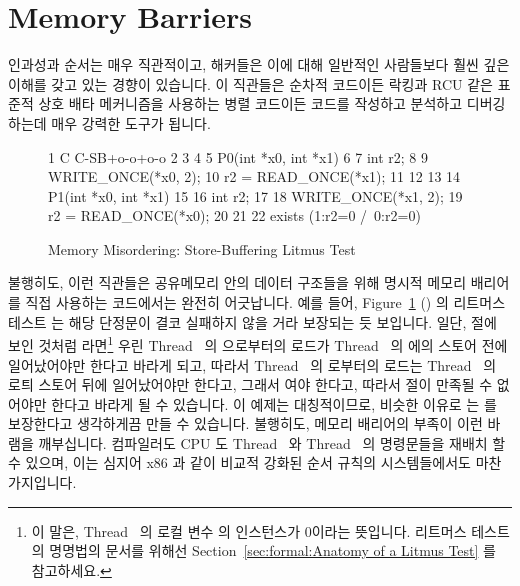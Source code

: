 
\section{Memory Barriers}
\label{sec:advsync:Memory Barriers}

인과성과 순서는 매우 직관적이고, 해커들은 이에 대해 일반적인 사람들보다 훨씬
깊은 이해를 갖고 있는 경향이 있습니다.
이 직관들은 순차적 코드이든 락킹과 RCU 같은 표준적 상호 배타 메커니즘을
사용하는 병렬 코드이든 코드를 작성하고 분석하고 디버깅하는데 매우 강력한 도구가
됩니다.

\begin{figure}
{ \scriptsize
\begin{verbbox}
 1 C C-SB+o-o+o-o
 2 {
 3 }
 4
 5 P0(int *x0, int *x1)
 6 {
 7   int r2;
 8
 9   WRITE_ONCE(*x0, 2);
10   r2 = READ_ONCE(*x1);
11 }
12
13
14 P1(int *x0, int *x1)
15 {
16   int r2;
17
18   WRITE_ONCE(*x1, 2);
19   r2 = READ_ONCE(*x0);
20 }
21
22 exists (1:r2=0 /\ 0:r2=0)
\end{verbbox}
}
\centering
\theverbbox
\caption{Memory Misordering: Store-Buffering Litmus Test}
\label{fig:advsync:Memory Misordering: Store-Buffering Litmus Test}
\end{figure}

불행히도, 이런 직관들은 공유메모리 안의 데이터 구조들을 위해 명시적 메모리
배리어를 직접 사용하는 코드에서는 완전히 어긋납니다.
예를 들어,
Figure~\ref{fig:advsync:Memory Misordering: Store-Buffering Litmus Test}
() 의 리트머스 테스트 는 해당 단정문이 결코 실패하지
않을 거라 보장되는 듯 보입니다.
일단,  절에 보인 것처럼  라면\footnote{
	이 말은, Thread~ 의 로컬 변수  의 인스턴스가 0이라는
	뜻입니다.
	리트머스 테스트의 명명법의 문서를 위해선
	Section~\ref{sec:formal:Anatomy of a Litmus Test}
	를 참고하세요.}
우린 Thread~ 의  으로부터의 로드가 Thread~ 의 
에의 스토어 전에 일어났어야만 한다고 바라게 되고, 따라서 Thread~ 의
 로부터의 로드는 Thread~ 의  로틔 스토어 뒤에
일어났어야만 한다고, 그래서  여야 한다고, 따라서  절이
만족될 수 없어야만 한다고 바라게 될 수 있습니다.
이 예제는 대칭적이므로, 비슷한 이유로  는  를
보장한다고 생각하게끔 만들 수 있습니다.
불행히도, 메모리 배리어의 부족이 이런 바램을 깨부십니다.
컴파일러도 CPU 도 Thread~ 와 Thread~ 의 명령문들을 재배치 할
수 있으며, 이는 심지어 x86 과 같이 비교적 강화된 순서 규칙의 시스템들에서도
마찬가지입니다.
\iffalse

